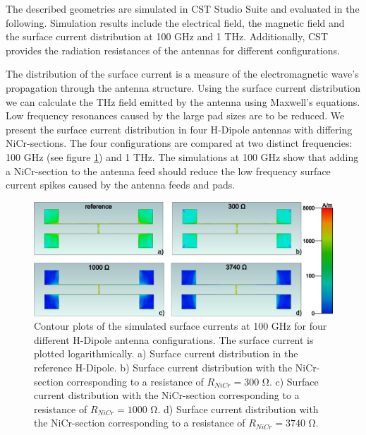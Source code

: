 The described geometries are simulated in CST Studio Suite and evaluated in the following. Simulation results include the electrical field, the magnetic field and the surface current distribution at \num{100} \si{\giga \hertz} and \num{1} \si{\tera \hertz}. Additionally, CST provides the radiation resistances of the antennas for different configurations. 

The distribution of the surface current is a measure of the electromagnetic wave's propagation through the antenna structure. Using the surface current distribution we can calculate the THz field emitted by the antenna using Maxwell's equations. Low frequency resonances caused by the large pad sizes are to be reduced. We present the surface current distribution in four H-Dipole antennas with differing NiCr-sections. The four configurations are compared at two distinct frequencies: \num{100} \si{\giga \hertz} (see figure \ref{sc_100ghz_comp}) and \num{1} \si{\tera \hertz}. The simulations at \num{100} \si{\giga \hertz} show that adding a NiCr-section to the antenna feed should reduce the low frequency surface current spikes caused by the antenna feeds and pads.


\begin{figure}[ht]
    \centering
    \includegraphics[width=\linewidth]{figures/Contour_Plots_v2/100Ghz_SC_sim_plots.png}
    \caption{Contour plots of the simulated surface currents at \num{100} \si{\giga \hertz} for four different H-Dipole antenna configurations. The surface current is plotted logarithmically. a) Surface current distribution in the reference H-Dipole. b) Surface current distribution with the NiCr-section corresponding to a resistance of $R_{NiCr} = 300$ \si{\ohm}. c) Surface current distribution with the NiCr-section corresponding to a resistance of $R_{NiCr} = 1000$ \si{\ohm}. d) Surface current distribution with the NiCr-section corresponding to a resistance of $R_{NiCr} = 3740$ \si{\ohm}.}
    \label{sc_100ghz_comp}
\end{figure}

